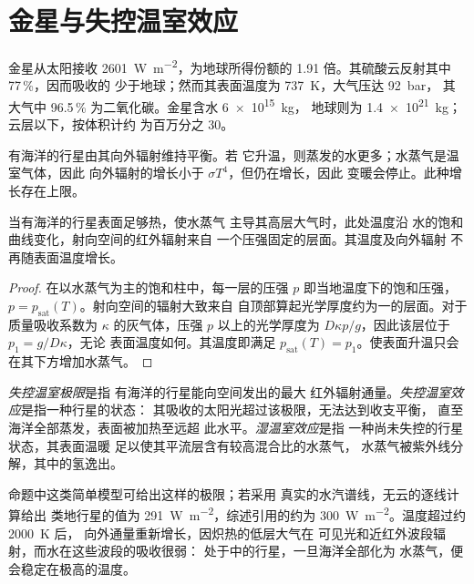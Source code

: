 \section{金星与失控温室效应}\label{sec:b3:planetary-atmospheres:venus}

金星从太阳接收 \qty{2601}{W.m^{-2}}，为地球所得份额的
1.91 倍。其硫酸云反射其中 77\,\%，因而吸收的
少于地球；然而其表面温度为 \qty{737}{K}，大气压达 \qty{92}{bar}，
其大气中 96.5\,\% 为二氧化碳。金星含水 \qty{6e15}{kg}，
地球则为 \qty{1.4e21}{kg}；云层以下，按体积计约
为百万分之 30。

有海洋的行星由其向外辐射维持平衡。若
它升温，则蒸发的水更多；水蒸气是温室气体，因此
向外辐射的增长小于 $\sigma T^4$，但仍在增长，因此
变暖会停止。此种增长存在上限。

\begin{proposition}[湿润大气的辐射极限]\label{prop:b3:planetary-atmospheres:limit}
当有海洋的行星表面足够热，使水蒸气
主导其高层大气时，此处温度沿
水的饱和曲线变化，射向空间的红外辐射来自
一个压强固定的层面。其温度及向外辐射
不再随表面温度增长。
\end{proposition}

\begin{proof}
在以水蒸气为主的饱和柱中，每一层的压强 $p$
即当地温度下的饱和压强，$p =
p_\mathrm{sat}(T)$。射向空间的辐射大致来自
自顶部算起光学厚度约为一的层面。对于质量吸收系数为
$\kappa$ 的灰气体，压强 $p$ 以上的光学厚度为
$D\kappa p/g$，因此该层位于 $p_1 = g/D\kappa$，无论
表面温度如何。其温度即满足
$p_\mathrm{sat}(T) = p_1$。使表面升温只会在其下方增加水蒸气。
\end{proof}

\begin{definition}\label{def:b3:planetary-atmospheres:runaway}
\emph{失控温室极限}是指
有海洋的行星能向空间发出的最大
红外辐射通量。\emph{失控温室效应}是指一种行星的状态：
其吸收的太阳光超过该极限，无法达到收支平衡，
直至海洋全部蒸发，表面被加热至远超
此水平。\emph{湿温室效应}是指
一种尚未失控的行星状态，其表面温暖
足以使其平流层含有较高混合比的水蒸气，
水蒸气被紫外线分解，其中的氢逸出。
\end{definition}

命题中这类简单模型可给出这样的极限；若采用
真实的水汽谱线，无云的逐线计算给出
类地行星的值为 \qty{291}{W.m^{-2}}，综述引用的约为
\qty{300}{W.m^{-2}}。温度超过约 \qty{2000}{K} 后，
向外通量重新增长，因炽热的低层大气在
可见光和近红外波段辐射，而水在这些波段的吸收很弱：
处于中的行星，一旦海洋全部化为
水蒸气，便会稳定在极高的温度。

